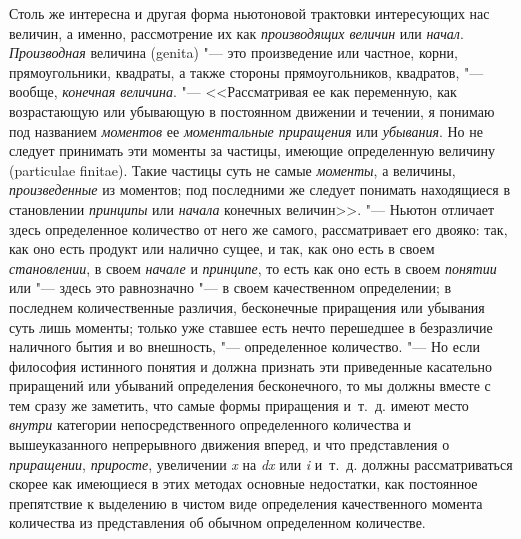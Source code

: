 Столь же интересна и другая форма ньютоновой трактовки интересующих нас
величин, а именно, рассмотрение их как {\em производящих величин} или
{\em начал}. {\em Производная} величина (genita) "--- это произведение или
частное, корни, прямоугольники, квадраты, а также стороны прямоугольников,
квадратов, "--- вообще, {\em конечная величина}. "--- <<Рассматривая ее как
переменную, как возрастающую или убывающую в постоянном движении и течении,
я понимаю под названием {\em моментов} ее {\em моментальные приращения} или
{\em убывания}. Но не следует принимать эти моменты за частицы, имеющие
определенную величину (particulae finitae). Такие частицы суть не самые
{\em моменты}, а величины, {\em произведенные} из моментов; под последними же
следует понимать находящиеся в становлении {\em принципы} или {\em начала}
конечных величин>>. "--- Ньютон отличает здесь определенное количество от него
же самого, рассматривает его двояко: так, как оно есть продукт или налично
сущее, и так, как оно есть в своем {\em становлении}, в своем {\em начале} и
{\em принципе}, то есть как оно есть в своем {\em понятии} или "--- здесь это
равнозначно "--- в своем качественном определении; в последнем количественные
различия, бесконечные приращения или убывания суть лишь моменты; только уже
ставшее есть нечто перешедшее в безразличие наличного бытия и во внешность,
"--- определенное количество. "--- Но если философия истинного понятия и должна
признать эти приведенные касательно приращений или убываний определения
бесконечного, то мы должны вместе с тем сразу же заметить, что самые формы
приращения и~т.~д. имеют место {\em внутри} категории непосредственного
определенного количества и вышеуказанного непрерывного движения вперед, и что
представления о {\em приращении}, {\em приросте}, увеличении {\em x} на
{\em dx} или {\em i} и~т.~д. должны рассматриваться скорее как имеющиеся в этих
методах основные недостатки, как постоянное препятствие к выделению в чистом
виде определения качественного момента количества из представления об обычном
определенном количестве.

